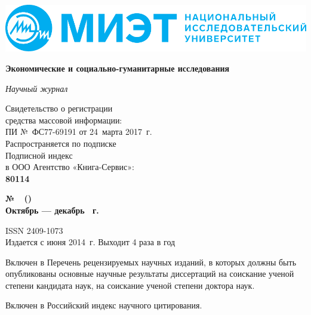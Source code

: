 \pagestyle{empty}
\begin{center}
  \includegraphics[width=\textwidth]{logo}
\vspace{3mm}

{\fontsize{16pt}{20pt}\selectfont\bfseries Экономические и социально-гуманитарные исследования \par}

{\itshape Научный журнал}
\end{center}

\noindent
\begin{minipage}{.5\textwidth}
  \small
Свидетельство о регистрации\\
средства массовой информации:\\
ПИ № ФС77-69191 от 24 марта 2017 г.\\
Распространяется по подписке\\
Подписной индекс\\
в ООО Агентство «Книга-Сервис»:\\
\textbf{80114}
\end{minipage}%
\begin{minipage}{.5\textwidth}
\begin{flushright}
  {\fontsize{16pt}{20pt}\selectfont\bfseries № \esgiNum~(\esgiNumT)\\
  Октябрь — декабрь \esgiYear г.\par}

  \vspace{5mm}
  \small
  ISSN 2409-1073\\
  Издается с июня 2014 г. Выходит 4 раза в год
\end{flushright}
\end{minipage}

\begin{flushleft}
  \small
  Включен в Перечень рецензируемых научных изданий, в которых должны быть опубликованы
основные научные результаты диссертаций на соискание ученой степени кандидата наук,
на соискание ученой степени доктора наук.

\vspace{5mm}
Включен в Российский индекс научного цитирования.
\end{flushleft}

\vspace{2cm}

